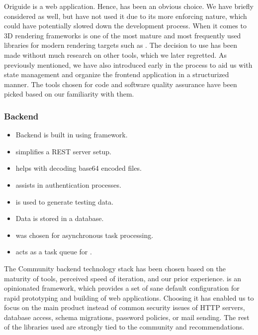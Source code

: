 Origuide is a web application. Hence,  has been an obvious choice. We have briefly considered  as well, but have not used it due to its more enforcing nature, which could have potentially slowed down the development process. When it comes to 3D rendering frameworks  is one of the most mature and most frequently used libraries for modern rendering targets such as . The decision to use  has been made without much research on other tools, which we later regretted. As previously mentioned, we have also introduced  early in the process to aid us with state management and organize the frontend application in a structurized manner. The tools chosen for code and software quality assurance have been picked based on our familiarity with them.


\subsubsection{Backend}

\begin{itemize}
	\item Backend is built in  using  framework. 
	\item {} simplifies a REST server setup.
	\item {} helps with decoding base64 encoded files.
	\item {} assists in authentication processes.
	\item {} is used to generate testing data.
	\item Data is stored in a  database.
	\item {} was chosen for asynchronous task processing.
	\item {} acts as a task queue for .
\end{itemize}

The Community backend technology stack has been chosen based on the maturity of tools, perceived speed of iteration, and our prior experience.  is an opinionated framework, which provides a set of sane default configuration for rapid prototyping and building of web applications. Choosing it has enabled us to focus on the main product instead of common security issues of HTTP servers, database access, schema migrations, password policies, or mail sending. The rest of the libraries used are strongly tied to the  community and recommendations.

